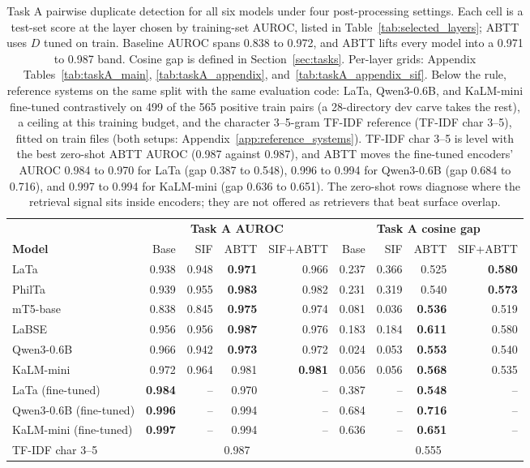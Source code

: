 \begin{table}[t]
\centering
\footnotesize
\setlength{\tabcolsep}{4.5pt}
\begin{tabular}{lrrrrrrrr}
\toprule
& \multicolumn{4}{c}{\textbf{Task A AUROC}} & \multicolumn{4}{c}{\textbf{Task A cosine gap}} \\
\cmidrule(lr){2-5}\cmidrule(lr){6-9}
\textbf{Model} & Base & SIF & ABTT & SIF+ABTT & Base & SIF & ABTT & SIF+ABTT \\
\midrule
LaTa & 0.938 & 0.948 & \textbf{0.971} & 0.966 & 0.237 & 0.366 & 0.525 & \textbf{0.580} \\
PhilTa & 0.939 & 0.955 & \textbf{0.983} & 0.982 & 0.231 & 0.319 & 0.540 & \textbf{0.573} \\
mT5-base & 0.838 & 0.845 & \textbf{0.975} & 0.974 & 0.081 & 0.036 & \textbf{0.536} & 0.519 \\
LaBSE & 0.956 & 0.956 & \textbf{0.987} & 0.976 & 0.183 & 0.184 & \textbf{0.611} & 0.580 \\
Qwen3-0.6B & 0.966 & 0.942 & \textbf{0.973} & 0.972 & 0.024 & 0.053 & \textbf{0.553} & 0.540 \\
KaLM-mini & 0.972 & 0.964 & 0.981 & \textbf{0.981} & 0.056 & 0.056 & \textbf{0.568} & 0.535 \\
\midrule
LaTa (fine-tuned) & \textbf{0.984} & -- & 0.970 & -- & 0.387 & -- & \textbf{0.548} & -- \\
Qwen3-0.6B (fine-tuned) & \textbf{0.996} & -- & 0.994 & -- & 0.684 & -- & \textbf{0.716} & -- \\
KaLM-mini (fine-tuned) & \textbf{0.997} & -- & 0.994 & -- & 0.636 & -- & \textbf{0.651} & -- \\
TF-IDF char 3--5 & \multicolumn{4}{c}{0.987} & \multicolumn{4}{c}{0.555} \\
\bottomrule
\end{tabular}
\caption{Task A pairwise duplicate detection for all six models under four post-processing settings. Each cell is a test-set score at the layer chosen by training-set AUROC, listed in Table~\ref{tab:selected_layers}; ABTT uses $D$ tuned on train. Baseline AUROC spans 0.838 to 0.972, and ABTT lifts every model into a 0.971 to 0.987 band. Cosine gap is defined in Section~\ref{sec:tasks}. Per-layer grids: Appendix Tables~\ref{tab:taskA_main}, \ref{tab:taskA_appendix}, and~\ref{tab:taskA_appendix_sif}. Below the rule, reference systems on the same split with the same evaluation code: LaTa, Qwen3-0.6B, and KaLM-mini fine-tuned contrastively on 499 of the 565 positive train pairs (a 28-directory dev carve takes the rest), a ceiling at this training budget, and the character 3--5-gram TF-IDF reference (TF-IDF char 3--5), fitted on train files (both setups: Appendix~\ref{app:reference_systems}). TF-IDF char 3--5 is level with the best zero-shot ABTT AUROC (0.987 against 0.987), and ABTT moves the fine-tuned encoders' AUROC 0.984 to 0.970 for LaTa (gap 0.387 to 0.548), 0.996 to 0.994 for Qwen3-0.6B (gap 0.684 to 0.716), and 0.997 to 0.994 for KaLM-mini (gap 0.636 to 0.651). The zero-shot rows diagnose where the retrieval signal sits inside encoders; they are not offered as retrievers that beat surface overlap.}
\label{tab:taskA_headline}
\end{table}

